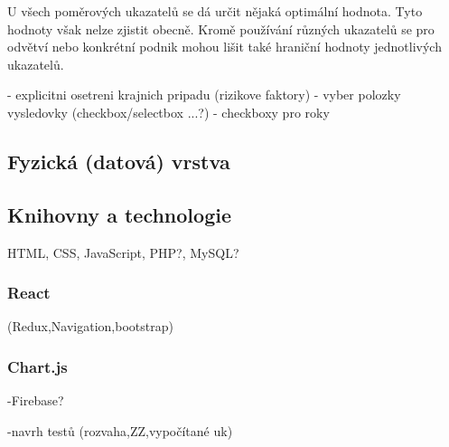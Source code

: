 U všech poměrových ukazatelů se dá určit nějaká optimální hodnota. Tyto hodnoty však nelze zjistit obecně. Kromě používání různých ukazatelů se pro odvětví nebo konkrétní podnik mohou lišit také hraniční hodnoty jednotlivých ukazatelů.


- explicitni osetreni krajnich pripadu (rizikove faktory)
- vyber polozky vysledovky (checkbox/selectbox ...?)
- checkboxy pro roky

\subsection{Fyzická (datová) vrstva}

\subsection{Knihovny a technologie}
HTML, CSS, JavaScript, PHP?, MySQL?

\subsubsection{React}

(Redux,Navigation,bootstrap)

\subsubsection{Chart.js}



-Firebase?

-navrh testů (rozvaha,ZZ,vypočítané uk)

